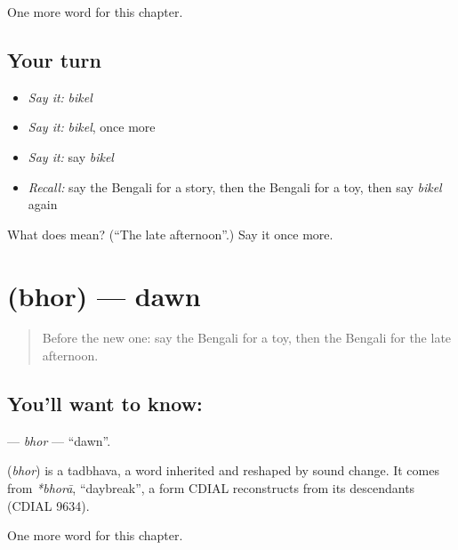 \begin{grammarlens}[title={What you've built}]
One more word for this chapter.
\end{grammarlens}

\subsection*{Your turn}
\begin{itemize}
\raggedright
  \item \emph{Say it:} \emph{bikel}
  \item \emph{Say it:} \emph{bikel}, once more
  \item \emph{Say it:} say \emph{bikel}
  \item \emph{Recall:} say the Bengali for a story, then the Bengali for a toy, then say \emph{bikel} again
\end{itemize}

\begin{tcolorbox}[breakable,colback=teal!4,colframe=teal!35!black,title={Before you move on}]
What does  mean? (\textquotedblleft{}The late afternoon\textquotedblright{}.) Say it once more.
\end{tcolorbox}
\section[\texorpdfstring{\bn{ভোর} (bhor)}{ভোর (bhor)}]{ (bhor) — dawn}

\label{lesson:BN-C90-bhor}



\begin{quote}
Before the new one: say the Bengali for a toy, then the Bengali for the late afternoon.
\end{quote}

\subsection*{You'll want to know: }
\textbf{} — \emph{bhor} — \textquotedblleft{}dawn\textquotedblright{}.

\begin{cousinweb}
\textbf{} (\emph{bhor}) is a tadbhava, a word inherited and reshaped by sound change. It comes from \emph{*bhorā}, \textquotedblleft{}daybreak\textquotedblright{}, a form CDIAL reconstructs from its descendants (CDIAL 9634).
\end{cousinweb}

\begin{grammarlens}[title={What you've built}]
One more word for this chapter.
\end{grammarlens}


